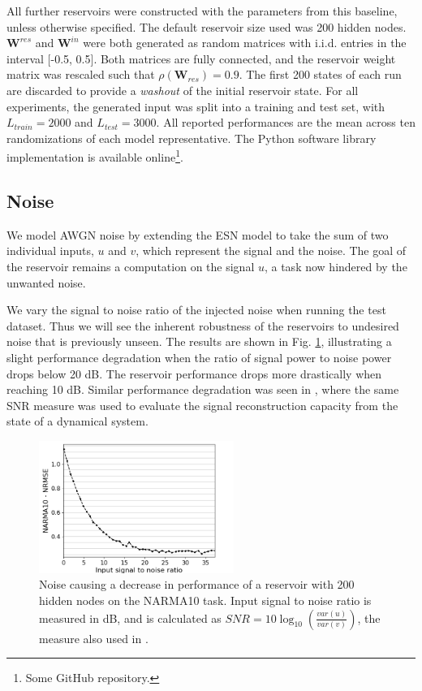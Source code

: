 All further reservoirs were constructed with the parameters from this baseline,
unless otherwise specified. The default reservoir size used was 200 hidden
nodes. $\mathbf{W}^{res}$ and $\mathbf{W}^{in}$ were both generated as random
matrices with i.i.d. entries in the interval [-0.5, 0.5]. Both matrices are
fully connected, and the reservoir weight matrix was rescaled such that
$\rho(\mathbf{W}_{res}) = 0.9$. The first 200 states of each run are discarded
to provide a \textit{washout} of the initial reservoir state. For all
experiments, the generated input was split into a training and test set, with
$L_{train} = 2000$ and $L_{test} = 3000$. All reported performances are the mean
across ten randomizations of each model representative. The Python software
library implementation is available online\footnote{Some GitHub repository.}.

\subsection{Noise}

We model AWGN noise by extending the ESN model to take the sum of two individual
inputs, $u$ and $v$, which represent the signal and the noise. The goal of the
reservoir remains a computation on the signal $u$, a task now hindered by the
unwanted noise.

We vary the signal to noise ratio of the injected noise when running the test
dataset. Thus we will see the inherent robustness of the reservoirs to undesired
noise that is previously unseen. The results are shown in
Fig. \ref{input_noise_snr}, illustrating a slight performance degradation when
the ratio of signal power to noise power drops below 20 dB. The reservoir
performance drops more drastically when reaching 10 dB. Similar performance
degradation was seen in \cite{dambre_information_2012}, where the same SNR
measure was used to evaluate the signal reconstruction capacity from the state
of a dynamical system.

\begin{figure}
  \centering
  \includegraphics[width=2.5in]{img/input_noise_snr.png}
  \caption{
    Noise causing a decrease in performance of a reservoir with 200 hidden nodes
on the NARMA10 task. Input signal to noise ratio is measured in dB, and is
calculated as $SNR = 10\log_{10}(\frac{var(u)}{var(v)})$, the measure also used
in \cite{dambre_information_2012}.
  }
  \label{input_noise_snr}
\end{figure}

